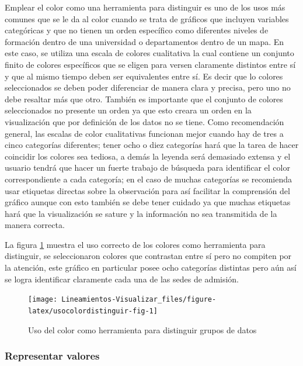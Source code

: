 \documentclass[
]{book}
\begin{document}
Emplear el color como una herramienta para distinguir es uno de los usos más comunes que se le da al color cuando se trata de gráficos que incluyen variables categóricas y que no tienen un orden específico como diferentes niveles de formación dentro de una universidad o departamentos dentro de un mapa. En este caso, se utiliza una escala de colores cualitativa la cual contiene un conjunto finito de colores específicos que se eligen para versen claramente distintos entre sí y que al mismo tiempo deben ser equivalentes entre sí. Es decir que lo colores seleccionados se deben poder diferenciar de manera clara y precisa, pero uno no debe resaltar más que otro. También es importante que el conjunto de colores seleccionados no presente un orden ya que esto creara un orden en la visualización que por definición de los datos no se tiene. Como recomendación general, las escalas de color cualitativas funcionan mejor cuando hay de tres a cinco categorías diferentes; tener ocho o diez categorías hará que la tarea de hacer coincidir los colores sea tediosa, a demás la leyenda será demasiado extensa y el usuario tendrá que hacer un fuerte trabajo de búsqueda para identificar el color correspondiente a cada categoría; en el caso de muchas categorías se recomienda usar etiquetas directas sobre la observación para así facilitar la comprensión del gráfico aunque con esto también se debe tener cuidado ya que muchas etiquetas hará que la visualización se sature y la información no sea transmitida de la manera correcta.

La figura \ref{fig:usocolordistinguir-fig} muestra el uso correcto de los colores como herramienta para distinguir, se seleccionaron colores que contrastan entre sí pero no compiten por la atención, este gráfico en particular posee ocho categorías distintas pero aún así se logra identificar claramente cada una de las sedes de admisión.

\begin{figure}

{\centering \texttt{[image: Lineamientos-Visualizar\_files/figure-latex/usocolordistinguir-fig-1]} 

}

\caption{Uso del color como herramienta para distinguir grupos de datos}\label{fig:usocolordistinguir-fig}
\end{figure}

\hypertarget{representar-valores}{%
\subsubsection{Representar valores}\label{representar-valores}}
\end{document}
